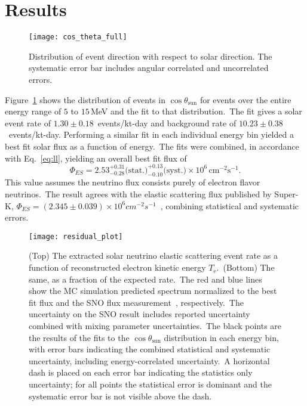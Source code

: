 \section{Results}
\begin{figure}
  \centering
  \texttt{[image: cos\_theta\_full]}
  \caption[5.0 to 15.0 MeV $\cos\theta_{sun}$ Distribution] {Distribution of event direction
                                              with respect to solar direction.
                                              The systematic error bar includes
                                              angular correlated and
                                              uncorrelated errors.}

  \label{fig:costheta}
\end{figure}
Figure~\ref{fig:costheta} shows the distribution of events in $\cos\theta_\text{{sun}}$
for events over the entire energy range of $5$ to $15$\,MeV and the fit to that distribution.\
The fit gives a solar event rate of $1.30\pm0.18$~events/kt-day
 and background rate of  $10.23\pm0.38$~events/kt-day.
Performing a similar fit in each individual energy bin yielded a best fit solar flux
as a function of energy.\
The fits were combined, in accordance with Eq.~\ref{eq:ll}, yielding an overall best fit flux of
\begin{equation*}
    \Phi_{ES}= 2.53^{+0.31}_{-0.28}\text{(stat.)}^{+0.13}_{-0.10}\text{(syst.)}\times10^6\,\text{cm}^{-2}\text{s}^{-1}\text{.}
\end{equation*}
This value assumes the neutrino flux consists purely of electron flavor neutrinos.\
The result agrees with the elastic scattering flux published by Super-K,
$\Phi_{ES}=\left(2.345\pm0.039\right)\times10^{6}cm^{-2}s^{-1}$~\citep{superk4},
combining statistical and systematic errors.\

\begin{figure}
  \centering
  \texttt{[image: residual\_plot]}
  \caption[Solar Spectrum Data to MC Comparison]{
    (Top) The extracted solar neutrino elastic scattering event rate as a
    function of reconstructed electron kinetic energy $T_{\mathrm{e}}$.\
    (Bottom) The same, as a fraction of the expected rate.\
    The red and blue lines show the MC simulation predicted spectrum normalized
    to the best fit flux and the SNO flux measurement~\citep{sno_combined}, respectively.\
    The uncertainty on the SNO result includes reported uncertainty combined with
    mixing parameter uncertainties.\
    The black points are the results of the fits to the $\cos\theta_\text{{sun}}$
    distribution in each energy bin,
    with error bars indicating the combined statistical and systematic
    uncertainty, including energy-correlated uncertainty.\
    A horizontal dash is placed on each error bar indicating the statistics
    only uncertainty; for all points the statistical error is dominant and the systematic
    error bar is not visible above the dash.}
  \label{fig:spectrum}
\end{figure}

